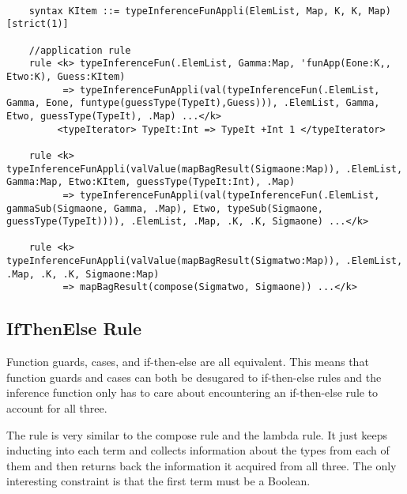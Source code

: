 \begin{lstlisting}

    syntax KItem ::= typeInferenceFunAppli(ElemList, Map, K, K, Map) [strict(1)]

    //application rule
    rule <k> typeInferenceFun(.ElemList, Gamma:Map, 'funApp(Eone:K,, Etwo:K), Guess:KItem)
          => typeInferenceFunAppli(val(typeInferenceFun(.ElemList, Gamma, Eone, funtype(guessType(TypeIt),Guess))), .ElemList, Gamma, Etwo, guessType(TypeIt), .Map) ...</k>
         <typeIterator> TypeIt:Int => TypeIt +Int 1 </typeIterator>

    rule <k> typeInferenceFunAppli(valValue(mapBagResult(Sigmaone:Map)), .ElemList, Gamma:Map, Etwo:KItem, guessType(TypeIt:Int), .Map)
          => typeInferenceFunAppli(val(typeInferenceFun(.ElemList, gammaSub(Sigmaone, Gamma, .Map), Etwo, typeSub(Sigmaone, guessType(TypeIt)))), .ElemList, .Map, .K, .K, Sigmaone) ...</k>

    rule <k> typeInferenceFunAppli(valValue(mapBagResult(Sigmatwo:Map)), .ElemList, .Map, .K, .K, Sigmaone:Map)
          => mapBagResult(compose(Sigmatwo, Sigmaone)) ...</k>

\end{lstlisting}

\subsection{IfThenElse Rule}

Function guards, cases, and if-then-else are all equivalent. This means that function guards and cases can both be desugared to if-then-else rules and the inference function only has to care about encountering an if-then-else rule to account for all three.

The rule is very similar to the compose rule and the lambda rule. It just keeps inducting into each term and collects information about the types from each of them and then returns back the information it acquired from all three. The only interesting constraint is that the first term must be a Boolean.

\begin{prooftree}
\end{prooftree}

